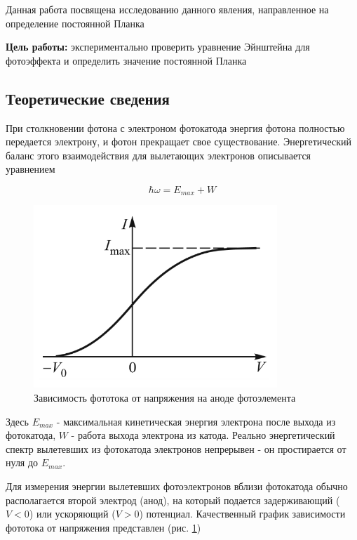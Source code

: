 \documentclass[12pt,a4paper]{article}
\begin{document}
Данная работа посвящена исследованию данного явления, направленное на определение постоянной Планка

\textbf{Цель работы:} экспериментально проверить уравнение Эйнштейна для фотоэффекта и определить значение постоянной Планка

\subsection{Теоретические сведения}

При столкновении фотона с электроном фотокатода энергия фотона полностью передается электрону, и фотон прекращает свое существование. Энергетический баланс этого взаимодействия для вылетающих электронов описывается уравнением
	
	\begin{equation}\label{energy balance}
	\hbar \omega = E_{max} + W
	\end{equation}
	
	\begin{figure}
		\includegraphics[width=\linewidth]{5.1.1-1}
		\caption{Зависимость фототока от напряжения на аноде фотоэлемента}
		\label{ris I(V)}
	\end{figure}
	
	Здесь $ E_{max} $ - максимальная кинетическая энергия электрона после выхода из фотокатода, $ W $ - работа выхода электрона из катода. Реально энергетический спектр вылетевших из фотокатода электронов непрерывен - он простирается от нуля до $ E_{max} $. 
	
	Для измерения энергии вылетевших фотоэлектронов вблизи фотокатода обычно располагается второй электрод (анод), на который подается задерживающий ($ V < 0 $) или ускоряющий ($ V > 0 $) потенциал. Качественный график зависимости фототока от напряжения представлен  (рис. \ref{ris I(V)})
	
\end{document}

